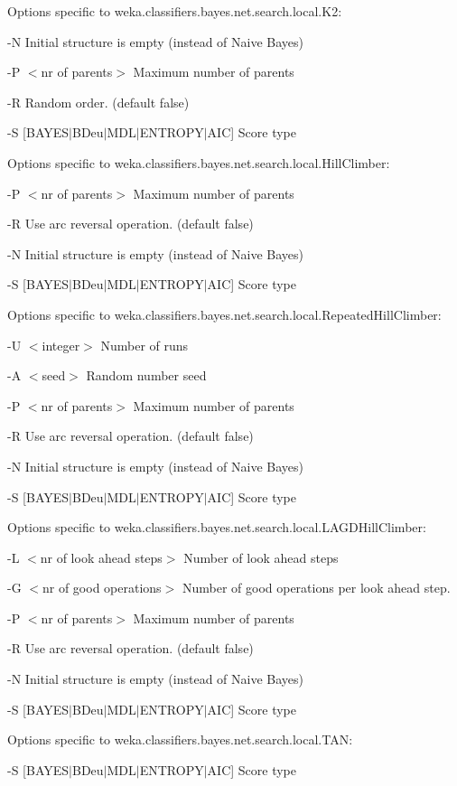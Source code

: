 \documentclass{article}
\begin{document}
Options specific to weka.classifiers.bayes.net.search.local.K2:

-N
	Initial structure is empty (instead of Naive Bayes)

-P $<$nr of parents$>$
	Maximum number of parents

-R
	Random order.
	(default false)

-S [BAYES$|$BDeu$|$MDL$|$ENTROPY$|$AIC]
	Score type 



\noindent Options specific to weka.classifiers.bayes.net.search.local.HillClimber:

-P $<$nr of parents$>$
	Maximum number of parents

-R
	Use arc reversal operation.
	(default false)

-N
	Initial structure is empty (instead of Naive Bayes)

-S [BAYES$|$BDeu$|$MDL$|$ENTROPY$|$AIC]
	Score type 



\noindent Options specific to weka.classifiers.bayes.net.search.local.RepeatedHillClimber:

-U $<$integer$>$
	Number of runs

-A $<$seed$>$
	Random number seed

-P $<$nr of parents$>$
	Maximum number of parents

-R
	Use arc reversal operation.
	(default false)

-N
	Initial structure is empty (instead of Naive Bayes)

-S [BAYES$|$BDeu$|$MDL$|$ENTROPY$|$AIC]
	Score type 

\noindent Options specific to weka.classifiers.bayes.net.search.local.LAGDHillClimber:

-L $<$nr of look ahead steps$>$
         Number of look ahead steps

-G $<$nr of good operations$>$
        Number of good operations per look ahead step.

-P $<$nr of parents$>$
	Maximum number of parents

-R
	Use arc reversal operation.
	(default false)

-N
	Initial structure is empty (instead of Naive Bayes)

-S [BAYES$|$BDeu$|$MDL$|$ENTROPY$|$AIC]
	Score type 


\noindent 
Options specific to weka.classifiers.bayes.net.search.local.TAN:

-S [BAYES$|$BDeu$|$MDL$|$ENTROPY$|$AIC]
	Score type 
\end{document}
